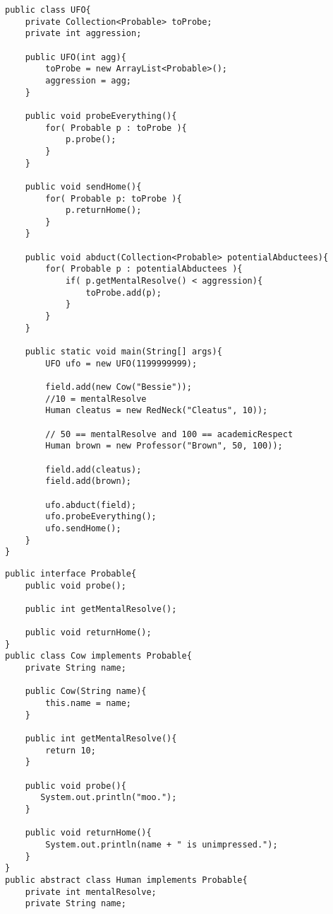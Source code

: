 \documentclass[11pt]{article}
\newenvironment{answer}{\large\lstset{basicstyle=\large}\color{white}}{}
\newenvironment{answer}{\large\lstset{basicstyle=\large}\color{red}}{}
\begin{document}
\begin{enumerate}
\begin{lstlisting}
public class UFO{
    private Collection<Probable> toProbe;
    private int aggression;

    public UFO(int agg){
        toProbe = new ArrayList<Probable>();
        aggression = agg;
    }

    public void probeEverything(){
        for( Probable p : toProbe ){
            p.probe();
        }
    }

    public void sendHome(){
        for( Probable p: toProbe ){
            p.returnHome();
        }
    }

    public void abduct(Collection<Probable> potentialAbductees){
        for( Probable p : potentialAbductees ){
            if( p.getMentalResolve() < aggression){
                toProbe.add(p);
            }
        }
    }

    public static void main(String[] args){
        UFO ufo = new UFO(1199999999);

        field.add(new Cow("Bessie"));
        //10 = mentalResolve
        Human cleatus = new RedNeck("Cleatus", 10));
        
        // 50 == mentalResolve and 100 == academicRespect
        Human brown = new Professor("Brown", 50, 100));         
        
        field.add(cleatus);
        field.add(brown);

        ufo.abduct(field);
        ufo.probeEverything();
        ufo.sendHome();
    }
}
\end{lstlisting}

\begin{answer}
\begin{lstlisting}
public interface Probable{
    public void probe();

    public int getMentalResolve();

    public void returnHome();
}
public class Cow implements Probable{
    private String name;

    public Cow(String name){
        this.name = name;
    }

    public int getMentalResolve(){
        return 10;
    }

    public void probe(){
       System.out.println("moo.");
    }

    public void returnHome(){
        System.out.println(name + " is unimpressed.");
    }
}
public abstract class Human implements Probable{
    private int mentalResolve;
    private String name;


\end{lstlisting}
\end{answer}
\end{enumerate}
\end{document}
